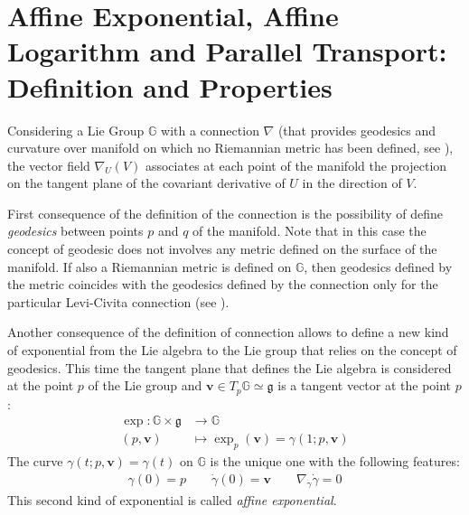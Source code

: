 %
%


\section{Affine Exponential, Affine Logarithm and Parallel Transport: Definition and Properties}\label{se:parallel_transport}

Considering a Lie Group $\mathbb{G}$ with a connection $\nabla$ (that provides geodesics and curvature over manifold on which no Riemannian metric has been defined, see \cite{do1992riemannian}), the vector field $\nabla_{U}(V)$ associates at each point of the manifold the projection on the tangent plane of the covariant derivative of $U$ in the direction of $V$. 

First consequence of the definition of the connection is the possibility of define \emph{geodesics} between points $p$ and $q$ of the manifold. 
Note that in this case the concept of geodesic does not involves any metric defined on the surface of the manifold. If also a Riemannian metric is defined on $\mathbb{G} $, then geodesics defined by the metric coincides with the geodesics defined by the connection only for the particular Levi-Civita connection (see \cite{do1992riemannian}).

Another consequence of the definition of connection allows to define a new kind of exponential from the Lie algebra to the Lie group that relies on the concept of geodesics. This time the tangent plane that defines the Lie algebra is considered at the point $p$ of the Lie group and $\mathbf{v} \in T_{p}\mathbb{G}\simeq \mathfrak{g}$ is a tangent vector at the point $p$: 
\begin{align*}
\exp :  \mathbb{G}  \times \mathfrak{g}     &\longrightarrow \mathbb{G}  
\\ 
(p,\mathbf{v}) &\longmapsto \exp_{p}(\mathbf{v})  = \gamma(1; p,\mathbf{v})
\end{align*}
The curve $\gamma(t;p,\mathbf{v}) = \gamma(t)$ on $\mathbb{G}$ is the unique one with the following features:  
\begin{align*}
\gamma(0) = p\qquad  \dot{\gamma}(0) =  \mathbf{v} \qquad \nabla_{\dot{\gamma}}\dot{\gamma} = 0 
\end{align*}
This second kind of exponential is called \emph{affine exponential}.

